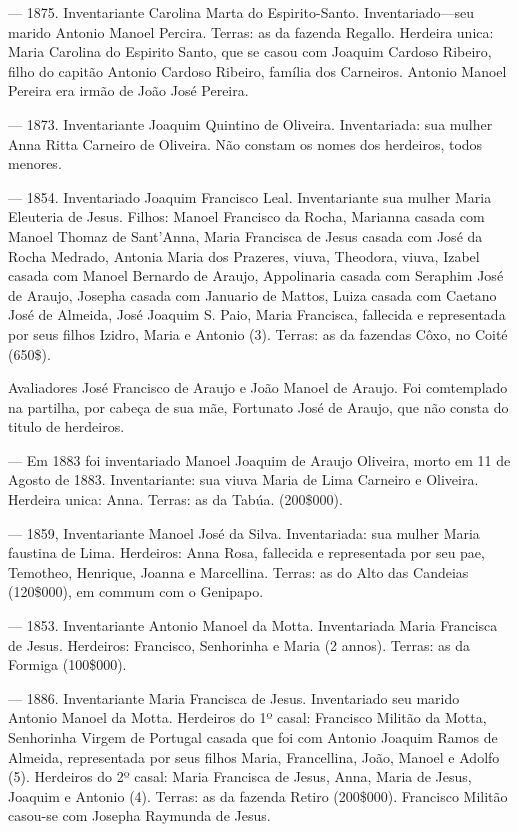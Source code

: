 — 1875. Inventariante Carolina Marta do Espirito-Santo. Inventariado—seu marido Antonio Manoel Percira. Terras: as da fazenda Regallo. Herdeira unica: Maria Carolina do Espirito Santo, que se casou com Joaquim Cardoso Ribeiro, filho do capitão Antonio Cardoso Ribeiro, família dos Carneiros. Antonio Manoel Pereira era irmão de João José Pereira.

— 1873. Inventariante Joaquim Quintino de Oliveira. Inventariada: sua mulher Anna Ritta Carneiro de Oliveira. Não constam os nomes dos herdeiros, todos menores.

— 1854. Inventariado Joaquim Francisco Leal. Inventariante sua mulher Maria Eleuteria de Jesus. Filhos: Manoel Francisco da Rocha, Marianna casada com Manoel Thomaz de Sant'Anna, Maria Francisca de Jesus casada com José da Rocha Medrado, Antonia Maria dos Prazeres, viuva, Theodora, viuva, Izabel casada com Manoel Bernardo de Araujo, Appolinaria casada com Seraphim José de Araujo, Josepha casada com Januario de Mattos, Luiza casada com Caetano José de Almeida, José Joaquim S. Paio, Maria Francisca, fallecida e representada por seus filhos Izidro, Maria e Antonio (3). Terras: as da fazendas Côxo, no Coité (650\$).

Avaliadores José Francisco de Araujo e João Manoel de Araujo. Foi comtemplado na partilha, por cabeça de sua mãe, Fortunato José de Araujo, que não consta do titulo de herdeiros.

— Em 1883 foi inventariado Manoel Joaquim de Araujo Oliveira, morto em 11 de Agosto de 1883. Inventariante: sua viuva Maria de Lima Carneiro e Oliveira. Herdeira unica: Anna. Terras: as da Tabúa. (200\$000).

— 1859, Inventariante Manoel José da Silva. Inventariada: sua mulher Maria faustina de Lima. Herdeiros: Anna Rosa, fallecida e representada por seu pae, Temotheo, Henrique, Joanna e Marcellina. Terras: as do Alto das Candeias (120\$000), em commum com o Genipapo.

— 1853. Inventariante Antonio Manoel da Motta. Inventariada Maria Francisca de Jesus. Herdeiros: Francisco, Senhorinha e Maria (2 annos). Terras: as da Formiga (100\$000).

— 1886. Inventariante Maria Francisca de Jesus. Inventariado seu marido Antonio Manoel da Motta. Herdeiros do 1º casal: Francisco Militão da Motta, Senhorinha Virgem de Portugal casada que foi com Antonio Joaquim Ramos de Almeida, representada por seus filhos Maria, Francellina, João, Manoel e Adolfo (5). Herdeiros do 2º casal: Maria Francisca de Jesus, Anna, Maria de Jesus, Joaquim e Antonio (4). Terras: as da fazenda Retiro (200\$000). Francisco Militão casou-se com Josepha Raymunda de Jesus.

